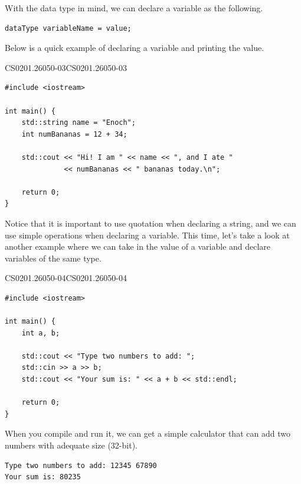 \documentclass[../../../main.tex]{subfiles}
\begin{document}
With the data type in mind, we can declare a variable as the
following.

\begin{basicbox}
\begin{lstlisting}[style=cppstyle]
dataType variableName = value;
\end{lstlisting}
\end{basicbox}

Below is a quick example of declaring a variable and printing
the value.

\begin{cppbox}{CS0201.26050-03}{CS0201.26050-03}
\begin{lstlisting}[style=cppstyle]
#include <iostream>

int main() {
    std::string name = "Enoch";
    int numBananas = 12 + 34;

    std::cout << "Hi! I am " << name << ", and I ate "
              << numBananas << " bananas today.\n";

    return 0;
}
\end{lstlisting}
\end{cppbox}

Notice that it is important to use quotation when declaring a
string, and we can use simple operations when declaring a variable.
This time, let's take a look at another example where we can
take in the value of a variable and declare variables of the same
type.

\begin{cppbox}{CS0201.26050-04}{CS0201.26050-04}
\begin{lstlisting}[style=cppstyle]
#include <iostream>

int main() {
    int a, b;

    std::cout << "Type two numbers to add: ";
    std::cin >> a >> b;
    std::cout << "Your sum is: " << a + b << std::endl;
    
    return 0;
}
\end{lstlisting}
\end{cppbox}

When you compile and run it, we can get a simple calculator that
can add two numbers with adequate size (32-bit).

\begin{outputbox}
\begin{lstlisting}[style=basic]
Type two numbers to add: 12345 67890
Your sum is: 80235
\end{lstlisting}
\end{outputbox}
\end{document}
